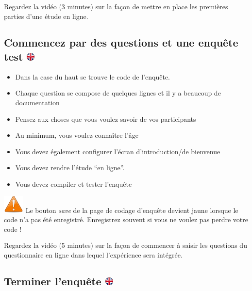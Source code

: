 \documentclass[
]{book}
\providecommand{\tightlist}{%
  \setlength{\itemsep}{0pt}\setlength{\parskip}{0pt}}
\begin{document}
Regardez la vidéo (3 minutes) sur la façon de mettre en place les premières parties d'une étude en ligne.

\hypertarget{commencez-par-des-questions-et-une-enquuxeate-test}{%
\subsection[Commencez par des questions et une enquête test ]{\texorpdfstring{Commencez par des questions et une enquête test \href{https://www.psytoolkit.org/lessons/project.html\#_start_with_questions_and_test_survey}{\protect\includegraphics{img/ukflag.png}}}{Commencez par des questions et une enquête test }}\label{commencez-par-des-questions-et-une-enquuxeate-test}}

\begin{itemize}
\tightlist
\item
  Dans la case du haut se trouve le code de l'enquête.
\item
  Chaque question se compose de quelques lignes et il y a beaucoup de documentation
\item
  Pensez aux choses que vous voulez savoir de vos participants
\item
  Au minimum, vous voulez connaître l'âge
\item
  Vous devez également configurer l'écran d'introduction/de bienvenue
\item
  Vous devez rendre l'étude ``en ligne''.
\item
  Vous devez compiler et tester l'enquête
\end{itemize}

\includegraphics{img/attention.png} Le bouton \emph{save} de la page de codage d'enquête devient jaune lorsque le code n'a pas été enregistré. {Enregistrez souvent si vous ne voulez pas perdre votre code !}

Regardez la vidéo (5 minutes) sur la façon de commencer à saisir les questions du questionnaire en ligne dans lequel l'expérience sera intégrée.

\hypertarget{terminer-lenquuxeate}{%
\subsection[Terminer l'enquête ]{\texorpdfstring{Terminer l'enquête \href{https://www.psytoolkit.org/lessons/project.html\#_finish_survey}{\protect\includegraphics{img/ukflag.png}}}{Terminer l'enquête }}\label{terminer-lenquuxeate}}
\end{document}
